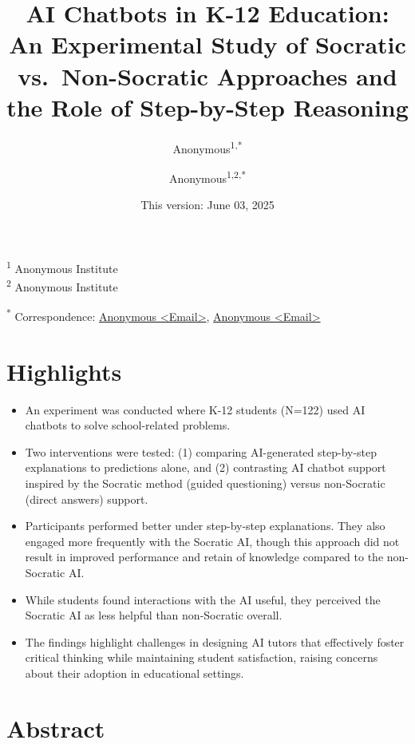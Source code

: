 \documentclass[
  12pt,
]{article}
\title{AI Chatbots in K-12 Education: An Experimental Study of Socratic vs.~Non-Socratic Approaches and the Role of Step-by-Step Reasoning}
\author{Anonymous\textsuperscript{1,*} \and Anonymous\textsuperscript{1,2,*}}
\date{This version: June 03, 2025}
\begin{document}
\maketitle

\textsuperscript{1} Anonymous Institute\\
\textsuperscript{2} Anonymous Institute

\textsuperscript{*} Correspondence: \href{mailto:Email}{Anonymous \textless{}Email\textgreater{}}, \href{mailto:Email}{Anonymous \textless{}Email\textgreater{}}

\section*{Highlights}\label{highlights}

\begin{itemize}
\item
  An experiment was conducted where K-12 students (N=122) used AI chatbots to solve school-related problems.
\item
  Two interventions were tested: (1) comparing AI-generated step-by-step explanations to predictions alone, and (2) contrasting AI chatbot support inspired by the Socratic method (guided questioning) versus non-Socratic (direct answers) support.
\end{itemize}

\begin{itemize}
\item
  Participants performed better under step-by-step explanations. They also engaged more frequently with the Socratic AI, though this approach did not result in improved performance and retain of knowledge compared to the non-Socratic AI.
\item
  While students found interactions with the AI useful, they perceived the Socratic AI as less helpful than non-Socratic overall.
\item
  The findings highlight challenges in designing AI tutors that effectively foster critical thinking while maintaining student satisfaction, raising concerns about their adoption in educational settings.
\end{itemize}

\section*{Abstract}\label{abstract}
\end{document}
